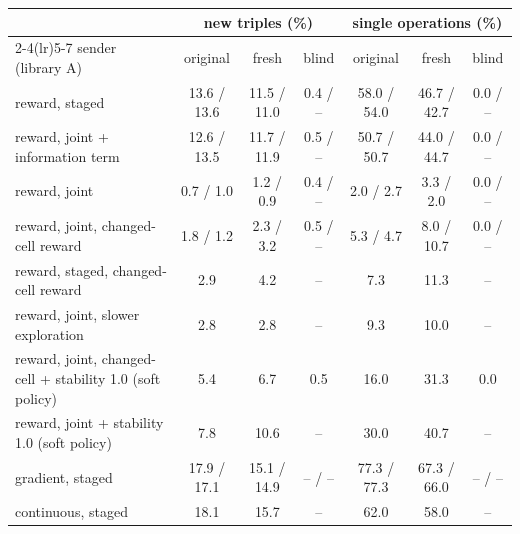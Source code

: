 \begin{tabular}{lcccccc}\toprule
 & \multicolumn{3}{c}{new triples (\%)} & \multicolumn{3}{c}{single operations (\%)} \\ \cmidrule(lr){2-4}\cmidrule(lr){5-7}
sender (library A) & original & fresh & blind & original & fresh & blind \\ \midrule
reward, staged & 13.6 / 13.6 & 11.5 / 11.0 & 0.4 / -- & 58.0 / 54.0 & 46.7 / 42.7 & 0.0 / -- \\
reward, joint + information term & 12.6 / 13.5 & 11.7 / 11.9 & 0.5 / -- & 50.7 / 50.7 & 44.0 / 44.7 & 0.0 / -- \\
reward, joint & 0.7 / 1.0 & 1.2 / 0.9 & 0.4 / -- & 2.0 / 2.7 & 3.3 / 2.0 & 0.0 / -- \\
reward, joint, changed-cell reward & 1.8 / 1.2 & 2.3 / 3.2 & 0.5 / -- & 5.3 / 4.7 & 8.0 / 10.7 & 0.0 / -- \\
reward, staged, changed-cell reward & 2.9 & 4.2 & -- & 7.3 & 11.3 & -- \\
reward, joint, slower exploration & 2.8 & 2.8 & -- & 9.3 & 10.0 & -- \\
reward, joint, changed-cell + stability 1.0 (soft policy) & 5.4 & 6.7 & 0.5 & 16.0 & 31.3 & 0.0 \\
reward, joint + stability 1.0 (soft policy) & 7.8 & 10.6 & -- & 30.0 & 40.7 & -- \\
gradient, staged & 17.9 / 17.1 & 15.1 / 14.9 & -- / -- & 77.3 / 77.3 & 67.3 / 66.0 & -- / -- \\
continuous, staged & 18.1 & 15.7 & -- & 62.0 & 58.0 & -- \\
\bottomrule
\end{tabular}
